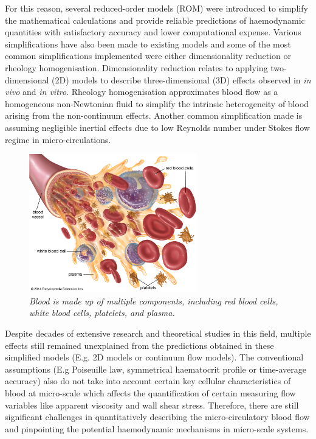 \noindent For this reason, several reduced-order models (ROM) were introduced to simplify the mathematical calculations and provide reliable predictions of haemodynamic quantities with satisfactory accuracy and lower computational expense. Various simplifications have also been made to existing models and some of the most common simplifications implemented were either dimensionality reduction or rheology homogenisation.\cite{CharlesPhDThesis2020} Dimensionality reduction relates to applying two-dimensional (2D) models to describe three-dimensional (3D) effects observed in \textit{in vivo} and \textit{in vitro}. Rheology homogenisation approximates blood flow as a homogeneous non-Newtonian fluid to simplify the intrinsic heterogeneity of blood arising from the non-continuum effects.\cite{CharlesPhDThesis2020} Another common simplification made is assuming negligible inertial effects due to low Reynolds number under Stokes flow regime in micro-circulations. 


\begin{figure}[H]
\centering
\includegraphics[width=0.65\textwidth]{images/BloodComponents.jpeg}
\caption{\textit{Blood is made up of multiple components, including red blood cells, white blood cells, platelets, and plasma. \cite{whitebloodcells}} \label{BloodComponents}}
\end{figure}


\noindent Despite decades of extensive research and theoretical studies in this field, multiple effects still remained unexplained from the predictions obtained in these simplified models (E.g. 2D models or continuum flow models). The conventional assumptions (E.g Poiseuille law, symmetrical haematocrit profile or time-average accuracy) also do not take into account certain key cellular characteristics of blood at micro-scale which affects the quantification of certain measuring flow variables like apparent viscosity and wall shear stress. Therefore, there are still significant challenges in quantitatively describing the micro-circulatory blood flow and pinpointing the potential haemodynamic mechanisms in micro-scale systems. \\


